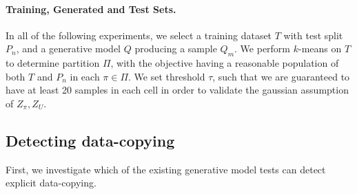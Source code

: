 \paragraph{Training, Generated and Test Sets.}
In all of the following experiments, we select a training dataset $T$ with test split $P_n$, and a generative model $Q$ producing a sample $Q_m$. We perform $k$-means on $T$ to determine partition $\Pi$, with the objective having a reasonable population of both $T$ and $P_n$ in each $\pi \in \Pi$. We set threshold $\tau$, such that we are guaranteed to have at least 20 samples in each cell in order to validate the gaussian assumption of $Z_\pi, Z_U$. 



\subsection{Detecting data-copying}
\label{sec:sensitivity to data-copying}

First, we investigate which of the existing generative model tests can detect explicit data-copying.

